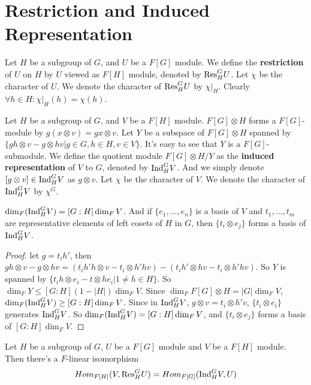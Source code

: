 \documentclass[12pt]{book}
\begin{document}
	\section{Restriction and Induced Representation}
	
	\begin{definition}
		Let $H$ be a subgroup of $G$, and $U$ be a $F[G]$ module. We define the {\bf restriction} of $U$ on $H$ by $U$ viewed as $F[H]$ module, denoted by ${\rm Res} ^G_H U$. Let $\chi$ be the character of $U$. We denote the character of ${\rm Res} ^G_H U$ by $\chi|_H$. Clearly $\forall h\in H: \chi|_H(h)=\chi(h)$.
	\end{definition}
	
	\begin{definition}
		Let $H$ be a subgroup of $G$, and $V$ be a $F[H]$ module. $F[G]\otimes H$ forms a $F[G]$-module by $g(x\otimes v)=gx\otimes v$. Let $Y$ be a subspace of $F[G]\otimes H$ spanned by $\{gh\otimes v-g\otimes hv|g\in G,h\in H,v\in V\}$. It's easy to see that $Y$ is a $F[G]$-submodule. We define the quotient module $F[G]\otimes H/Y$ as the {\bf induced representation} of $V$ to $G$, denoted by ${\rm Ind}^G_HV$. And we simply denote $[g\otimes v]\in {\rm Ind}^G_HV$ as $g\otimes v$. Let $\chi$ be the character of $V$. We denote the character of ${\rm Ind} ^G_H V$ by $\chi^G$.
	\end{definition}
	
	\begin{theorem}
		$\dim_F({\rm Ind} ^G_H V)=[G:H]\dim_F V$. And if $\{e_1,\dots,e_n\}$ is a basis of $V$ and $t_1,\dots,t_m$ are representative elements of left cosets of $H$ in $G$, then $\{t_i\otimes e_j\}$ forms a basis of ${\rm Ind} ^G_H V$.
	\end{theorem}
	\begin{proof}
		let $g=t_ih'$, then $gh\otimes v-g\otimes hv=(t_ih'h\otimes v-t_i\otimes h'hv)-(t_ih'\otimes hv-t_i\otimes h'hv)$. So $Y$ is spanned by $\{t_ih\otimes e_i-t\otimes he_i|1\neq h\in H\}$. So $\dim_FY\leq[G:H](1-|H|)\dim_F V$. Since $\dim_F F[G]\otimes H=|G|\dim_F V$, $\dim_F({\rm Ind} ^G_H V)\geq[G:H]\dim_F V$. Since in ${\rm Ind} ^G_H V$, $g\otimes v=t_i\otimes h'v$, $\{t_i\otimes e_i\}$ generates ${\rm Ind} ^G_H V$. So $\dim_F({\rm Ind} ^G_H V)=[G:H]\dim_F V$, and $\{t_i\otimes e_j\}$ forms a basis of $[G:H]\dim_F V$.
	\end{proof}
	
	\begin{theorem}[Frobenius]
		Let $H$ be a subgroup of $G$, $U$ be a $F[G]$ module and $V$ be a $F[H]$ module. Then there's a $F$-linear isomorphism
		\begin{equation}
			Hom_{F[H]}(V,{\rm Res} ^G_H U)=Hom_{F[G]}({\rm Ind} ^G_H V,U)
		\end{equation}
	\end{theorem}
	
\end{document}
